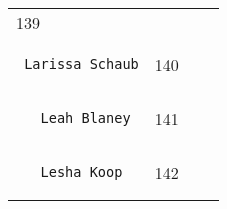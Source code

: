 \documentclass[]{article}
\begin{document}
\begin{longtable}[c]{@{}llll@{}}
\begin{minipage}[t]{0.10\columnwidth}
139
\end{minipage} & \begin{minipage}[t]{0.13\columnwidth}\raggedright
\end{minipage} & \begin{minipage}[t]{0.15\columnwidth}\raggedright
\end{minipage}
\\\noalign{\medskip}
\begin{minipage}[t]{0.39\columnwidth}\raggedright
\begin{verbatim}
 Larissa Schaub
\end{verbatim}
\end{minipage} & \begin{minipage}[t]{0.10\columnwidth}\raggedright
140
\end{minipage} & \begin{minipage}[t]{0.13\columnwidth}\raggedright
\end{minipage} & \begin{minipage}[t]{0.15\columnwidth}\raggedright
\end{minipage}
\\\noalign{\medskip}
\begin{minipage}[t]{0.39\columnwidth}\raggedright
\begin{verbatim}
   Leah Blaney
\end{verbatim}
\end{minipage} & \begin{minipage}[t]{0.10\columnwidth}\raggedright
141
\end{minipage} & \begin{minipage}[t]{0.13\columnwidth}\raggedright
\end{minipage} & \begin{minipage}[t]{0.15\columnwidth}\raggedright
\end{minipage}
\\\noalign{\medskip}
\begin{minipage}[t]{0.39\columnwidth}\raggedright
\begin{verbatim}
   Lesha Koop
\end{verbatim}
\end{minipage} & \begin{minipage}[t]{0.10\columnwidth}\raggedright
142
\end{minipage} & \begin{minipage}[t]{0.13\columnwidth}\raggedright
\end{minipage} & \begin{minipage}[t]{0.15\columnwidth}\raggedright

\end{minipage}
\end{longtable}
\end{document}
